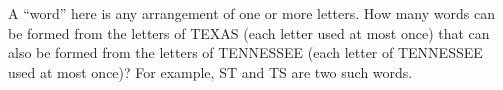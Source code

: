A ``word'' here is any arrangement of one or more letters. How many words can be formed from the letters of TEXAS (each letter used at most once) that can also be formed from the letters of TENNESSEE (each letter of TENNESSEE used at most once)? For example, ST and TS are two such words.
